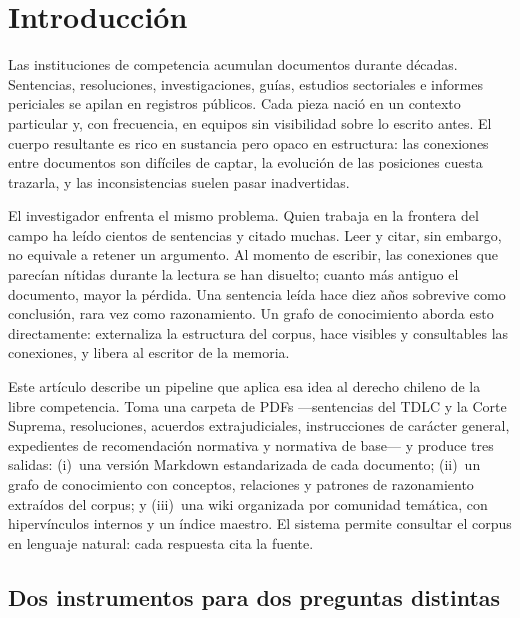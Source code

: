 \documentclass[12pt,a4paper]{article}
\begin{document}
\newpage
\tableofcontents
\newpage

\section{Introducción}

Las instituciones de competencia acumulan documentos durante décadas. Sentencias,
resoluciones, investigaciones, guías, estudios sectoriales e informes periciales
se apilan en registros públicos. Cada pieza nació en un contexto particular y,
con frecuencia, en equipos sin visibilidad sobre lo escrito antes. El cuerpo
resultante es rico en sustancia pero opaco en estructura: las conexiones entre
documentos son difíciles de captar, la evolución de las posiciones cuesta
trazarla, y las inconsistencias suelen pasar inadvertidas.

El investigador enfrenta el mismo problema. Quien trabaja en la frontera del
campo ha leído cientos de sentencias y citado muchas. Leer y citar, sin embargo,
no equivale a retener un argumento. Al momento de escribir, las conexiones que
parecían nítidas durante la lectura se han disuelto; cuanto más antiguo el
documento, mayor la pérdida. Una sentencia leída hace diez años sobrevive como
conclusión, rara vez como razonamiento.\autocite{schrepel2026brain} Un grafo de
conocimiento aborda esto directamente: externaliza la estructura del corpus,
hace visibles y consultables las conexiones, y libera al escritor de la memoria.

Este artículo describe un pipeline que aplica esa idea al derecho chileno de la
libre competencia. Toma una carpeta de PDFs —sentencias del TDLC y la Corte
Suprema, resoluciones, acuerdos extrajudiciales, instrucciones de carácter
general, expedientes de recomendación normativa y normativa de base— y produce
tres salidas: (i)~una versión Markdown estandarizada de cada documento;
(ii)~un grafo de conocimiento con conceptos, relaciones y patrones de
razonamiento extraídos del corpus; y (iii)~una wiki organizada por comunidad
temática, con hipervínculos internos y un índice maestro. El sistema permite
consultar el corpus en lenguaje natural: cada respuesta cita la fuente.

\subsection{Dos instrumentos para dos preguntas distintas}
\end{document}
